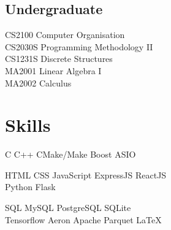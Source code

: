 \documentclass[a4paper,hidelinks]{resume} %
\begin{document}
\begin{minipage}[t]{0.45\textwidth}
    
    \subsection{Undergraduate}
    
    CS2100 Computer Organisation \\
    CS2030S Programming Methodology II \\
    CS1231S Discrete Structures \\
    MA2001 Linear Algebra I \\
    MA2002 Calculus \\
    
    \sectionspace %
    
    
    \section{Skills}
    
    \sectionspace %
    
    
    C \textbullet{} C++ \textbullet{} CMake/Make \textbullet{} Boost \textbullet{} ASIO \\
    
    
    HTML \textbullet{} CSS \textbullet{} JavaScript \textbullet{} ExpressJS \textbullet{} ReactJS \\ \textbullet{} Python \textbullet{} Flask\\
    
    
    SQL \textbullet{} MySQL \textbullet{} PostgreSQL \textbullet{} SQLite \\
    
    Tensorflow \textbullet{} Aeron \textbullet{} Apache Parquet \textbullet{}\LaTeX\ \\
    
    \sectionspace %
    
    

\end{minipage}
\end{document}
